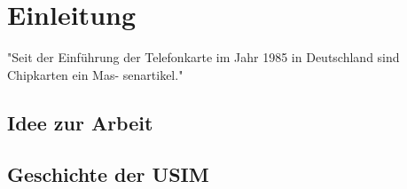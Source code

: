 \section{Einleitung}
\label{einleitung}

"Seit der Einführung der Telefonkarte im Jahr 1985 in Deutschland sind Chipkarten ein Mas-
senartikel."\cite{spitz11}

 \subsection{Idee zur Arbeit}
 \subsection{Geschichte der USIM}
 \label{geschichte-usim}
\clearpage